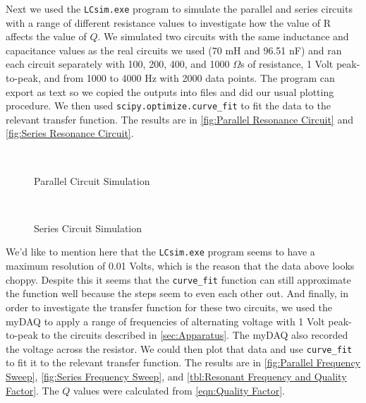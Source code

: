 \documentclass[12pt]{article}
\numberwithin{equation}{section}
\numberwithin{figure}{section}
\begin{document}
    Next we used the \texttt{LCsim.exe} program to simulate the parallel and series circuits with 
    a range of different resistance values to investigate how the value of R affects the value of $Q$. 
    We simulated two circuits with the same inductance and capacitance values as the real circuits we 
    used (70 mH and 96.51 nF) and ran each circuit separately with 100, 200, 400, and 1000 $\Omega$s 
    of resistance, 1 Volt peak-to-peak, and from 1000 to 4000 Hz with 2000 data points. The program 
    can export as text so we copied the outputs into  files and did our usual plotting 
    procedure. We then used \texttt{scipy.optimize.curve\_fit} to fit the data to the relevant 
    transfer function. The results are in \autoref{fig:Parallel Resonance Circuit} and 
    \autoref{fig:Series Resonance Circuit}.
    \begin{figure}[H]%
        \centering
        \,
        \,
        \,
        \caption{Parallel Circuit Simulation}
        \label{fig:Parallel Simulation}
    \end{figure}
    \begin{figure}[H]%
        \centering
        \,
        \,
        \,
        \caption{Series Circuit Simulation}
        \label{fig:Series Simulation}
    \end{figure}
    We'd like to mention here that the \texttt{LCsim.exe} program seems to have a maximum resolution 
    of 0.01 Volts, which is the reason that the data above looks choppy. Despite this it seems that 
    the \texttt{curve\_fit} function can still approximate the function well because the steps seem 
    to even each other out. \newline \newline
    And finally, in order to investigate the transfer function for these two circuits, we used the 
    myDAQ to apply a range of frequencies of alternating voltage with 1 Volt peak-to-peak to the 
    circuits described in \autoref{sec:Apparatus}. The myDAQ also recorded the voltage across the 
    resistor. We could then plot that data and use \texttt{curve\_fit} to fit it to the relevant 
    transfer function. The results are in \autoref{fig:Parallel Frequency Sweep}, 
    \autoref{fig:Series Frequency Sweep}, and \autoref{tbl:Resonant Frequency and Quality Factor}.
    The $Q$ values were calculated from \autoref{eqn:Quality Factor}.
\end{document}
